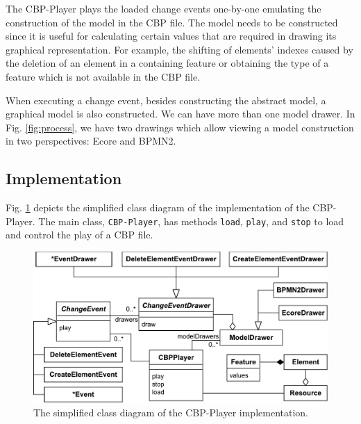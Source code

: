\documentclass[conference]{IEEEtran}
\begin{document}
The CBP-Player plays the loaded change events one-by-one emulating the construction of the model in the CBP file.
The model needs to be constructed since it is useful for calculating certain values 
that are required in drawing its graphical representation.
For example, the shifting of elements' indexes caused by the deletion of an element in a containing feature or 
obtaining the type of a feature which is not available in the CBP file. 

When executing a change event, besides constructing the abstract model, 
a graphical model is also constructed. We can have more than one model drawer. 
In Fig. \ref{fig:process}, we have two drawings 
which allow viewing a model construction in two perspectives: Ecore and BPMN2.

\subsection{Implementation}
\label{sec:implementation}
Fig. \ref{fig:class_diagram} depicts the simplified class diagram 
of the implementation of the CBP-Player. The main class, \texttt{CBP-Player}, has methods \texttt{load},
\texttt{play}, and \texttt{stop} to load and control the play of a CBP file.

\begin{figure}[h]
    \includegraphics[width=\linewidth]{class_diagram}
    \caption{The simplified class diagram of the CBP-Player implementation.}
    \label{fig:class_diagram}
\end{figure}
\end{document}
